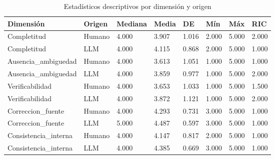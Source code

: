 \begin{table}[htbp]
\centering
\caption{Estadísticos descriptivos por dimensión y origen}
\label{tab:descriptivos}
\begin{tabular}{llllllll}
\toprule
Dimensión & Origen & Mediana & Media & DE & Mín & Máx & RIC \\
\midrule
Completitud & Humano & 4.000 & 3.907 & 1.016 & 2.000 & 5.000 & 2.000 \\
Completitud & LLM & 4.000 & 4.115 & 0.868 & 2.000 & 5.000 & 1.000 \\
Ausencia\_ambiguedad & Humano & 4.000 & 3.613 & 1.051 & 1.000 & 5.000 & 1.000 \\
Ausencia\_ambiguedad & LLM & 4.000 & 3.859 & 0.977 & 1.000 & 5.000 & 2.000 \\
Verificabilidad & Humano & 4.000 & 3.653 & 1.033 & 1.000 & 5.000 & 1.500 \\
Verificabilidad & LLM & 4.000 & 3.872 & 1.121 & 1.000 & 5.000 & 2.000 \\
Correccion\_fuente & Humano & 4.000 & 4.293 & 0.731 & 3.000 & 5.000 & 1.000 \\
Correccion\_fuente & LLM & 5.000 & 4.487 & 0.597 & 3.000 & 5.000 & 1.000 \\
Consistencia\_interna & Humano & 4.000 & 4.147 & 0.817 & 2.000 & 5.000 & 1.000 \\
Consistencia\_interna & LLM & 4.000 & 4.385 & 0.669 & 3.000 & 5.000 & 1.000 \\
\bottomrule
\end{tabular}
\end{table}
